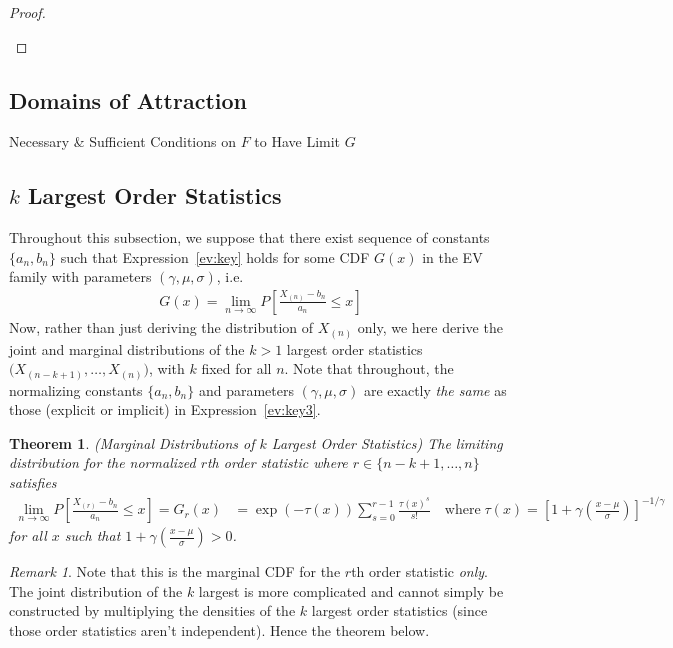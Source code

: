 \documentclass[12pt]{article}
\theoremstyle{plain}
\newtheorem{thm}{Theorem}[section]
\theoremstyle{definition}
\theoremstyle{remark}
\newtheorem*{rmk}{Remark}
\newcommand{\ra}{\rightarrow}
\newcommand{\limn}{\lim_{n\rightarrow\infty}}
\begin{document}
\begin{proof}
\begin{itemize}
\end{itemize}


\end{proof}



\clearpage
\subsection{Domains of Attraction}

Necessary \& Sufficient Conditions on $F$ to Have Limit $G$


\clearpage
\subsection{$k$ Largest Order Statistics}

Throughout this subsection, we suppose that there exist sequence of
constants $\{a_n,b_n\}$ such that Expression~\ref{ev:key} holds for some
CDF $G(x)$ in the EV family with parameters $(\gamma,\mu,\sigma)$, i.e.
\begin{align}
  G(x)
  =\lim_{n\ra\infty}P\left[\frac{X_{(n)}-b_n}{a_n} \leq x\right]
  \label{ev:key3}
\end{align}
Now, rather than just deriving the distribution of $X_{(n)}$ only, we
here derive the joint and marginal distributions of the $k>1$
largest order statistics $\big(X_{(n-k+1)},\ldots,X_{(n)})$, with $k$
fixed for all $n$.
Note that throughout, the normalizing constants $\{a_n,b_n\}$ and
parameters $(\gamma,\mu,\sigma)$ are exactly \emph{the same} as those
(explicit or implicit) in Expression~\ref{ev:key3}.

\begin{thm}\emph{(Marginal Distributions of $k$ Largest Order Statistics)}
The limiting distribution for the normalized $r$th order statistic where
$r\in\{n-k+1,\ldots,n\}$ satisfies
\begin{align*}
  \limn
  P\left[
    \frac{X_{(r)}-b_n}{a_n}
    \leq
    x
  \right]
  = G_{r}(x)
  &=
  \exp\left(
    -\tau(x)
  \right)
  \sum_{s=0}^{r-1}
  \frac{\tau(x)^s}{s!}
  \quad\text{where}\;
  \tau(x)
  =
  \left[
    1+\gamma\left(\frac{x-\mu}{\sigma}\right)
  \right]^{-1/\gamma}
\end{align*}
for all $x$ such that
$1+\gamma\left(\frac{x-\mu}{\sigma}\right)>0$.
\end{thm}
\begin{rmk}
Note that this is the marginal CDF for the $r$th order statistic
\emph{only}.
The joint distribution of the $k$ largest is more complicated and
cannot simply be constructed by multiplying the densities of the $k$
largest order statistics (since those order statistics aren't
independent). Hence the theorem below.
\end{rmk}
\end{document}
